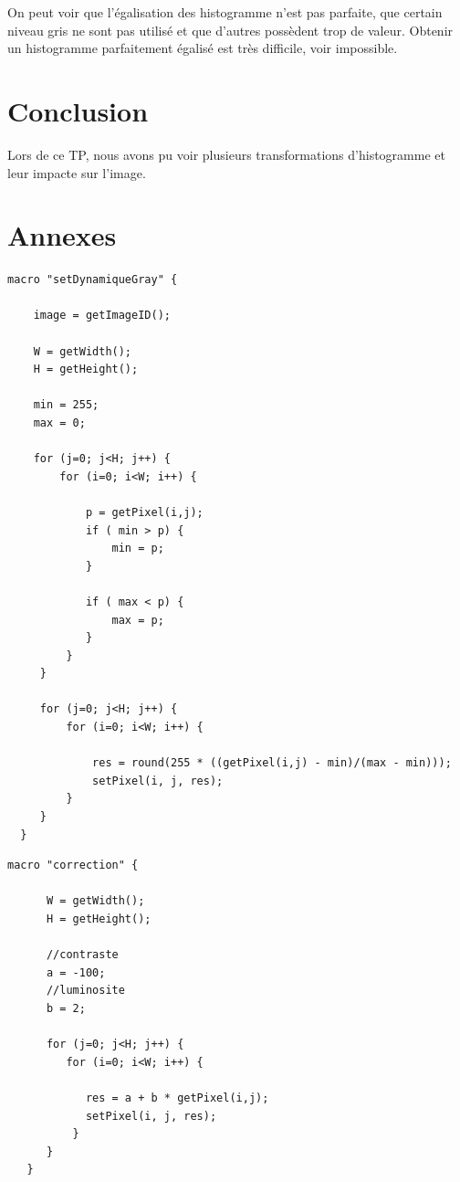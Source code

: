 \documentclass[a4paper,11pt]{article}
\begin{document}
  On peut voir que l'égalisation des histogramme n'est pas parfaite, que certain niveau gris ne sont pas utilisé et que d'autres 
  possèdent trop de valeur. Obtenir un histogramme parfaitement égalisé est très difficile, voir impossible.
  \section*{Conclusion}
  Lors de ce TP, nous avons pu voir plusieurs transformations d'histogramme et leur impacte sur l'image.
  \newpage
  
  \section*{Annexes}
  \begin{lstlisting}[caption=Macro d'extension d'histogramme]
  macro "setDynamiqueGray" {

    image = getImageID();

    W = getWidth();
    H = getHeight();

    min = 255;
    max = 0;

    for (j=0; j<H; j++) {
        for (i=0; i<W; i++) {

            p = getPixel(i,j);
            if ( min > p) {
                min = p;
            }

            if ( max < p) {
                max = p;
            }
         }
     }

     for (j=0; j<H; j++) {
         for (i=0; i<W; i++) {

             res = round(255 * ((getPixel(i,j) - min)/(max - min)));
             setPixel(i, j, res);
         }
     }
  }
  \end{lstlisting}
  
  \begin{lstlisting}[caption=Macro de la correction affine]
   macro "correction" {

      W = getWidth();
      H = getHeight();

      //contraste
      a = -100;
      //luminosite
      b = 2;

      for (j=0; j<H; j++) {
         for (i=0; i<W; i++) {

            res = a + b * getPixel(i,j);
            setPixel(i, j, res);
          }
      }
   }
  \end{lstlisting}

    
\end{document}
